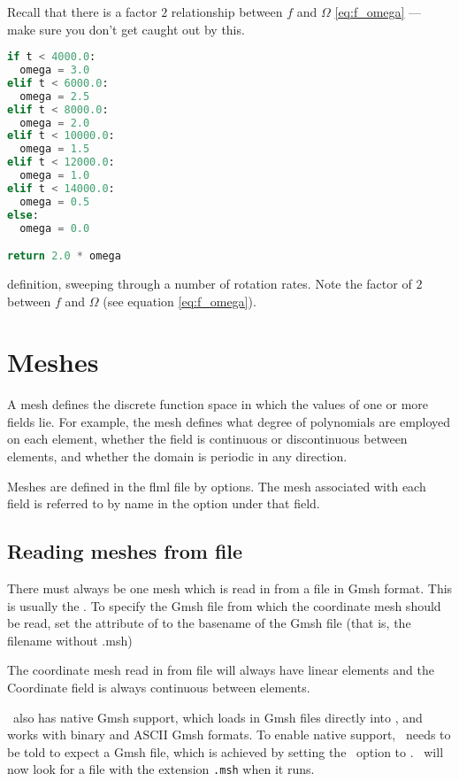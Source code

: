 Recall that there is a factor $2$ relationship between $f$ and $\Omega$
\eqref{eq:f_omega} --- make sure you don't get caught out by this.

\begin{example}
\begin{lstlisting}[language = Python]
if t < 4000.0:
  omega = 3.0
elif t < 6000.0:
  omega = 2.5
elif t < 8000.0:
  omega = 2.0
elif t < 10000.0:
  omega = 1.5
elif t < 12000.0:
  omega = 1.0
elif t < 14000.0:
  omega = 0.5
else:
  omega = 0.0

return 2.0 * omega
\end{lstlisting}
\caption{ definition, sweeping through a number of
         rotation rates. Note the factor of $2$ between $f$ and $\Omega$ (see
         equation \eqref{eq:f_omega}).}
\label{ex:python_f_plane}
\end{example}


\section{Meshes}\label{sec:Mesh}

A mesh defines the discrete
function space in which the values of one or more fields lie. For example, the mesh
defines what degree of polynomials are employed on each element, whether the
field is continuous or discontinuous between elements, and whether the
domain is periodic in any direction. 

Meshes are defined in the flml file by  options. The
mesh associated with each field is referred to by name in the
 option under that field.

\subsection{Reading meshes from file}
There must always be one mesh which is read in from a file in
Gmsh format. This is usually the . To specify the
Gmsh file from which the coordinate mesh should be read, set the
 attribute of
 to the basename
of the Gmsh file (that is, the filename without .msh)

The coordinate mesh read in from file will always have linear elements and
the Coordinate field is always continuous between elements.

\fluidity\ also has native Gmsh support, which loads in Gmsh files directly into
\fluidity, and works with binary and ASCII Gmsh formats. To enable native 
support, \fluidity\ needs to be told to expect a Gmsh file, which is achieved 
by setting the \onlypdf{}\ option 
to \onlypdf{}.  \fluidity\ will now look for a file with the extension 
\lstinline[language=bash]+.msh+ when it runs.

